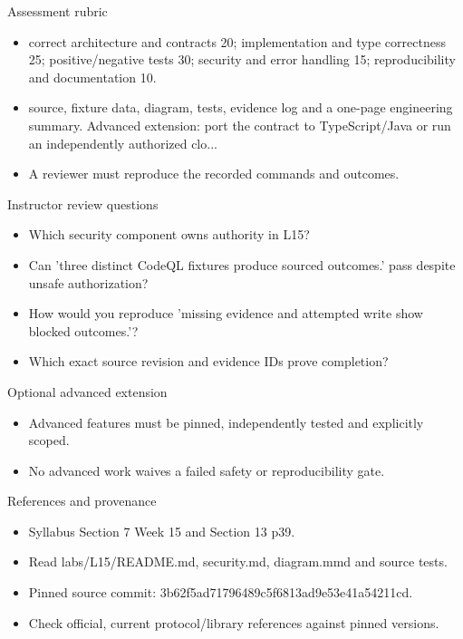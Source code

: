 \documentclass[aspectratio=169,10pt]{beamer}
\begin{document}
\begin{frame}{Assessment rubric}
\small
\begin{itemize}
\item correct architecture and contracts 20; implementation and type correctness 25; positive/negative tests 30; security and error handling 15; reproducibility and documentation 10.
\item source, fixture data, diagram, tests, evidence log and a one-page engineering summary. Advanced extension: port the contract to TypeScript/Java or run an independently authorized clo...
\item A reviewer must reproduce the recorded commands and outcomes.
\end{itemize}

\end{frame}

\begin{frame}{Instructor review questions}
\small
\begin{itemize}
\item Which security component owns authority in L15?
\item Can 'three distinct CodeQL fixtures produce sourced outcomes.' pass despite unsafe authorization?
\item How would you reproduce 'missing evidence and attempted write show blocked outcomes.'?
\item Which exact source revision and evidence IDs prove completion?
\end{itemize}

\end{frame}

\begin{frame}{Optional advanced extension}
\small
\begin{itemize}
\item Advanced features must be pinned, independently tested and explicitly scoped.
\item No advanced work waives a failed safety or reproducibility gate.
\end{itemize}

\end{frame}

\begin{frame}{References and provenance}
\small
\begin{itemize}
\item Syllabus Section 7 Week 15 and Section 13 p39.
\item Read labs/L15/README.md, security.md, diagram.mmd and source tests.
\item Pinned source commit: 3b62f5ad71796489c5f6813ad9e53e41a54211cd.
\item Check official, current protocol/library references against pinned versions.
\end{itemize}

\end{frame}
\end{document}

